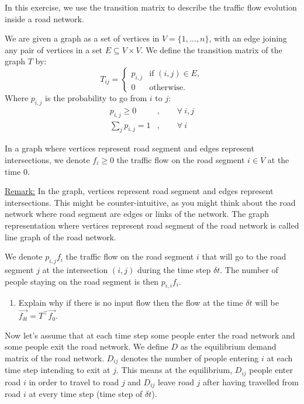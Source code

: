
In this exercise, we use the transition matrix to describe the traffic flow evolution inside a road network.

We are given a graph as a set of vertices in $V = \{1,...,n\}$, with an edge joining any pair of vertices in a set $E \subseteq V \times V$. 
We define the transition matrix of the graph $T$ by:
\[
T_{ij} = \left\{ 
\begin{array}{ll}
p_{i,j} & \mbox{if } (i,j) \in E, \\
0 & \mbox{otherwise.}
\end{array}
\right.
\]
Where $p_{i,j}$ is the probability to go from $i$ to $j$:
\begin{align*}
    p_{i,j}\geq 0 &, \quad \quad \forall\ i,j \\
    \sum\limits_{j} p_{i,j} = 1 &, \quad \quad \forall\ i
\end{align*}

In a graph where vertices represent road segment and edges represent intersections, we denote $f_i\geq 0$ the traffic flow on the road segment $i\in V$ at the time $0$.

\underline{Remark:} In the graph, vertices represent road segment and edges represent intersections. This might be counter-intuitive, as you might think about the road network where road segment are edges or links of the network.
The graph representation where vertices represent road segment of the road network is called line graph of the road network.

We denote $p_{i,j} f_{i}$ the traffic flow on the road segment $i$ that will go to the road segment $j$ at the intersection $(i,j)$ during the time step $\delta t$.
The number of people staying on the road segment is then $p_{i,i} f_i$.


\begin{enumerate}
\item Explain why if there is no input flow then the flow at the time $\delta t$ will be $\vec{f_{\delta t}} = T^\top \vec{f_{0}}$.

\sol{}
\end{enumerate}

Now let's assume that at each time step some people enter the road network and some people exit the road network.
We define $D$ as the equilibrium demand matrix of the road network.
$D_{ij}$ denotes the number of people entering $i$ at each time step intending to exit at $j$. 
This means at the equilibrium, $D_{ij}$ people enter road $i$ in order to travel to road $j$ and $D_{ij}$ leave road $j$ after having travelled from road $i$ at every time step (time step of $\delta t$). 

